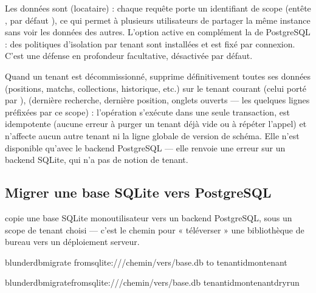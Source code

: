 \documentclass[letterpaper,10pt,french]{sphinxmanual}
\begin{document}
\sphinxAtStartPar
Les données sont  (locataire) : chaque requête porte
un identifiant de scope (en\sphinxhyphen{}tête , par défaut ), ce
qui permet à plusieurs utilisateurs de partager la même instance sans voir les
données des autres. L’option  active en complément la  de PostgreSQL : des politiques d’isolation par tenant sont
installées et  est fixé par connexion. C’est une défense en
profondeur facultative, désactivée par défaut.

\sphinxAtStartPar
Quand un tenant est décommissionné,  supprime
définitivement toutes ses données (positions, matchs, collections, historique,
etc.) sur le tenant courant (celui porté par ),  (dernière recherche, dernière position, onglets ouverts —
les quelques lignes  préfixées par ce scope) : l’opération
s’exécute dans une seule transaction, est idempotente (aucune erreur à purger
un tenant déjà vide ou à répéter l’appel) et n’affecte aucun autre tenant ni la
ligne globale de version de schéma. Elle n’est disponible qu’avec le backend
PostgreSQL — elle renvoie une erreur  sur un backend SQLite, qui n’a
pas de notion de tenant.


\subsection{Migrer une base SQLite vers PostgreSQL}
\label{\detokenize{mode_headless:migrer-une-base-sqlite-vers-postgresql}}\label{\detokenize{mode_headless:headless-migrate}}
\sphinxAtStartPar
{} copie une base SQLite mono\sphinxhyphen{}utilisateur vers un backend
PostgreSQL, sous un scope de tenant choisi — c’est le chemin pour « téléverser »
une bibliothèque de bureau vers un déploiement serveur.

\begin{sphinxVerbatim}[commandchars=\\\{\}]
blunderdbmigrate
\PYGZhy{}\PYGZhy{}fromsqlite:///chemin/vers/base.db
\PYGZhy{}\PYGZhy{}to
\PYGZhy{}\PYGZhy{}tenant\PYGZhy{}idmon\PYGZhy{}tenant

blunderdbmigrate\PYGZhy{}\PYGZhy{}fromsqlite:///chemin/vers/base.db
\PYGZhy{}\PYGZhy{}tenant\PYGZhy{}idmon\PYGZhy{}tenant\PYGZhy{}\PYGZhy{}dry\PYGZhy{}run
\end{sphinxVerbatim}
\end{document}
